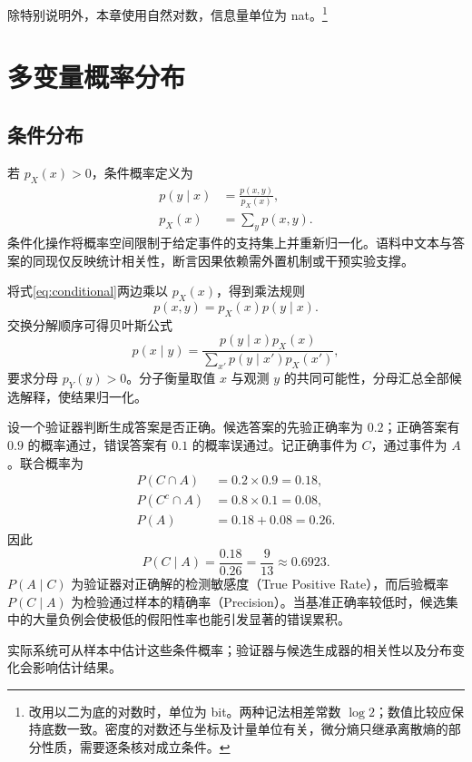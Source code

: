\documentclass[../textbook.tex]{subfiles}
\begin{document}
除特别说明外，本章使用自然对数，信息量单位为 nat。\footnote{改用以二为底的对数时，单位为 bit。两种记法相差常数 $\log 2$；数值比较应保持底数一致。密度的对数还与坐标及计量单位有关，微分熵只继承离散熵的部分性质，需要逐条核对成立条件。}

\section{多变量概率分布}

\subsection{条件分布}
若 $p_X(x)>0$，条件概率定义为
\begin{equation}\label{eq:conditional}
\begin{aligned}
 p(y\mid x) &= \frac{p(x,y)}{p_X(x)}, \\
 p_X(x) &= \sum_y p(x,y).
\end{aligned}
\end{equation}
条件化操作将概率空间限制于给定事件的支持集上并重新归一化。语料中文本与答案的同现仅反映统计相关性，断言因果依赖需外置机制或干预实验支撑。

将式\eqref{eq:conditional}两边乘以 $p_X(x)$，得到乘法规则
\begin{equation}
 p(x,y)=p_X(x)p(y\mid x).
\end{equation}
交换分解顺序可得贝叶斯公式
\begin{equation}
 p(x\mid y)=\frac{p(y\mid x)p_X(x)}{\sum_{x'}p(y\mid x')p_X(x')},
\end{equation}
要求分母 $p_Y(y)>0$。分子衡量取值 $x$ 与观测 $y$ 的共同可能性，分母汇总全部候选解释，使结果归一化。

\begin{example}[验证器通过后的正确率]
设一个验证器判断生成答案是否正确。候选答案的先验正确率为 $0.2$；正确答案有 $0.9$ 的概率通过，错误答案有 $0.1$ 的概率误通过。记正确事件为 $C$，通过事件为 $A$。联合概率为
\begin{align*}
 P(C\cap A)&=0.2\times0.9=0.18,\\
 P(C^c\cap A)&=0.8\times0.1=0.08,\\
 P(A)&=0.18+0.08=0.26.
\end{align*}
因此
\begin{equation*}
 P(C\mid A)=\frac{0.18}{0.26}=\frac9{13}\approx0.6923.
\end{equation*}
$P(A\mid C)$ 为验证器对正确解的检测敏感度（True Positive Rate），而后验概率 $P(C\mid A)$ 为检验通过样本的精确率（Precision）。当基准正确率较低时，候选集中的大量负例会使极低的假阳性率也能引发显著的错误累积。

实际系统可从样本中估计这些条件概率；验证器与候选生成器的相关性以及分布变化会影响估计结果。
\end{example}
\end{document}
